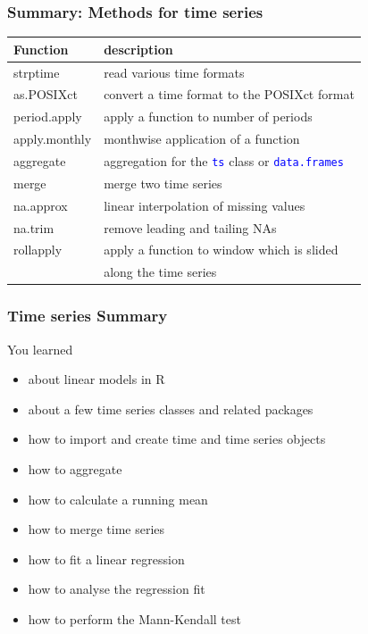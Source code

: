 \documentclass[xcolor=table, xcolor=dvipsnames]{beamer}\usepackage[]{graphicx}\usepackage[]{color}
\newcommand{\rcode}[1]{\texttt{\textcolor{Blue}{#1}}} %
\begin{document}
\begin{frame}[fragile]\frametitle{Summary: Methods for time series}

\begin{table}
  \begin{center}
	\label{tab:ts_methods}
	\begin{tabular}{ll}
		\toprule
		Function & description \\
		\midrule
		strptime &  read various time formats \\
		as.POSIXct & convert a time format to the POSIXct format \\
    period.apply& apply a function to number of periods\\
    apply.monthly& monthwise application of a function\\
    aggregate& aggregation for the \rcode{ts} class or \rcode{data.frames}\\
    merge& merge two time series\\
    na.approx & linear interpolation of missing values\\
    na.trim& remove leading and tailing NAs\\
    rollapply & apply a function to window which is slided \\
    & along the time series\\
		\bottomrule
	\end{tabular}
  \end{center}
\end{table}
\end{frame}


\begin{frame}[fragile]\frametitle{Time series Summary} 
You learned
\begin{itemize}
\item about linear models in R
\item about a few time series classes and related packages
\item how to import and create time and time series objects
\item how to aggregate
\item how to calculate a running mean
\item how to merge time series
\item how to fit a linear regression
\item how to analyse the regression fit
\item how to perform the Mann-Kendall test
\end{itemize}
\end{frame}
\end{document}
